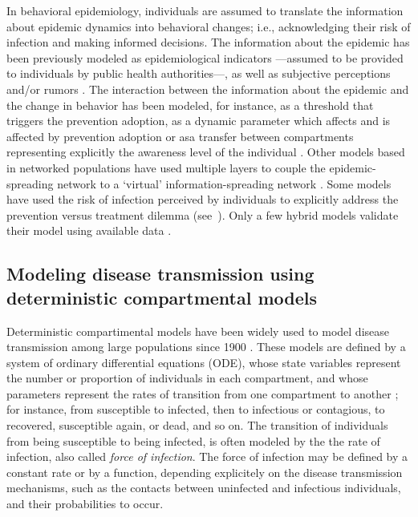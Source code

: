 In behavioral epidemiology, individuals are assumed to translate the information about epidemic dynamics into behavioral changes; i.e., acknowledging their risk of infection and making informed decisions. The information about the epidemic has been previously modeled as epidemiological indicators ---assumed to be provided to individuals by public health authorities---, as well as subjective perceptions and/or rumors \cite[]{Verelst2016}. The interaction between the information about the epidemic and the change in behavior has been modeled, for instance, as a threshold that triggers the prevention adoption, as a dynamic parameter which affects and is affected by prevention adoption or asa transfer between compartments representing explicitly the awareness level of the individual \cite[]{Verelst2016}. Other models based in networked populations have used multiple layers to couple the epidemic-spreading network to a `virtual' information-spreading network \cite[]{Wang2016}. Some models have used the risk of infection perceived by individuals to explicitly address the prevention versus treatment dilemma (see~). Only a few hybrid models validate their model using available data \cite[]{Verelst2016}.

							
\subsection{Modeling disease transmission using deterministic compartmental models}

Deterministic compartimental models have been widely used to model disease transmission among large populations since 1900 \cite[]{Brauer2017}. These models are defined by a system of ordinary differential equations (ODE), whose state variables represent the number or proportion of individuals in each compartment, and whose parameters represent the rates of transition from one compartment to another \cite[]{Hethcote2000}; for instance, from susceptible to infected, then to infectious or contagious, to recovered, susceptible again, or dead, and so on. The transition of individuals from being susceptible to being infected, is often modeled by the the rate of infection, also called \textit{force of infection}. The force of infection may be defined by a constant rate or by a function, depending explicitely on the disease transmission mechanisms, such as the contacts between uninfected and infectious individuals, and their probabilities to occur. 

